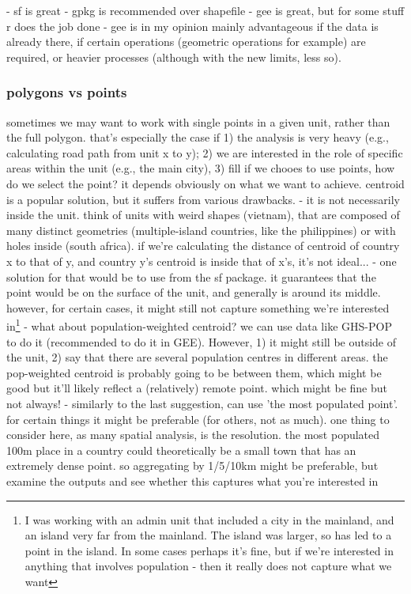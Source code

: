 - sf is great
- gpkg is recommended over shapefile 
- gee is great, but for some stuff r does the job done - gee is in my opinion mainly advantageous if the data is already there, if certain operations (geometric operations for example) are required, or heavier processes (although with the new limits, less so). 

\subsubsection{polygons vs points}
sometimes we may want to work with single points in a given unit, rather than the full polygon. that's especially the case if 1) the analysis is very heavy (e.g., calculating road path from unit x to y); 2) we are interested in the role of specific areas within the unit (e.g., the main city), 3) fill
if we chooes to use points, how do we select the point? it depends obviously on what we want to achieve.
centroid is a popular solution, but it suffers from various drawbacks. 
- it is not necessarily inside the unit. think of units with weird shapes (vietnam), that are composed of many distinct geometries (multiple-island countries, like the philippines) or with holes inside (south africa). if we're calculating the distance of centroid of country x to that of y, and country y's centroid is inside that of x's, it's not ideal...
- one solution for that would be to use  from the sf package. it guarantees that the point would be on the surface of the unit, and generally is around its middle. however, for certain cases, it might still not capture something we're interested in\footnote{I was working with an admin unit that included a city in the mainland, and an island very far from the mainland. The island was larger, so  has led to a point in the island. In some cases perhaps it's fine, but if we're interested in anything that involves population - then it really does not capture what we want}
- what about population-weighted centroid? we can use data like GHS-POP to do it (recommended to do it in GEE). However, 1) it might still be outside of the unit, 2) say that there are several population centres in different areas. the pop-weighted centroid is probably going to be between them, which might be good but it'll likely reflect a (relatively) remote point. which might be fine but not always!
- similarly to the last suggestion, can use 'the most populated point'. for certain things it might be preferable (for others, not as much). one thing to consider here, as many spatial analysis, is the resolution. the most populated 100m place in a country could theoretically be a small town that has an extremely dense point. so aggregating by 1/5/10km might be preferable, but examine the outputs and see whether this captures what you're interested in


